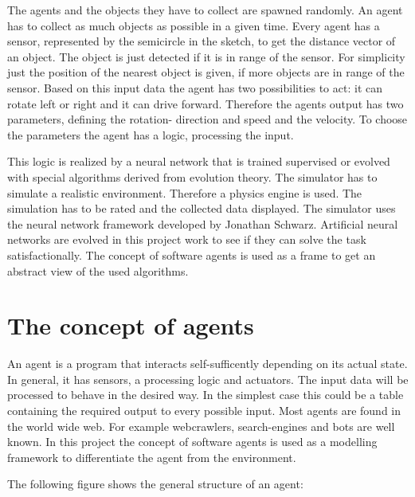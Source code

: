 \documentclass[10pt,a4paper,DIV=11]{scrreprt}
\begin{document}
The agents and the objects they have to collect are spawned randomly. An agent has to collect as much objects as possible in a given time. Every agent has a sensor, represented by the semicircle in the sketch, to get the distance vector of an object.
The object is just detected if it is in range of the sensor. For simplicity just the position of the nearest object is given, if more objects are in range of the sensor. Based on this input data the agent has two possibilities to act: it can rotate left or right and it can drive forward. Therefore the agents output has two parameters, defining the rotation- direction and speed and the velocity.
To choose the parameters the agent has a logic, processing the input.

This logic is realized  by a neural network that is trained supervised or evolved with special algorithms derived from evolution theory.
The simulator has to simulate a realistic environment. Therefore a physics engine is used.
The simulation has to be rated and the collected data displayed. The simulator uses the neural network framework developed by Jonathan Schwarz.
Artificial neural networks are evolved in this project work to see if they can solve the task satisfactionally.
The concept of software agents is used as a frame to get an abstract view of the used algorithms. \\




\chapter{The concept of agents}
An agent is a program that interacts self-sufficently depending on its actual state. In general, it has sensors, a processing logic and actuators. The input data will be processed to behave in the desired way. In the simplest case this could be a table containing the required output to every possible input.
Most agents are found in the world wide web. For example webcrawlers, search-engines and bots are well known.
In this project the concept of software agents is used as a modelling framework to differentiate the agent from the environment.

The following figure shows the general structure of an agent:
\end{document}
